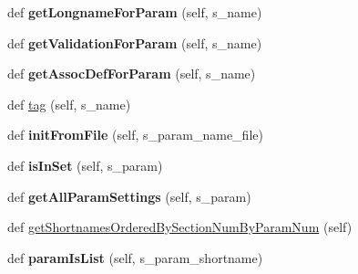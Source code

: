 \begin{DoxyCompactItemize}
\item 
def {\bfseries get\+Longname\+For\+Param} (self, s\+\_\+name)\hypertarget{classnegui_1_1pgparamset_1_1PGParamSet_a4e6b1c2c38ed89404aefcaa95c1ae8e3}{}\label{classnegui_1_1pgparamset_1_1PGParamSet_a4e6b1c2c38ed89404aefcaa95c1ae8e3}

\item 
def {\bfseries get\+Validation\+For\+Param} (self, s\+\_\+name)\hypertarget{classnegui_1_1pgparamset_1_1PGParamSet_a551326a24cfdff0bc6e0d7dd18c70757}{}\label{classnegui_1_1pgparamset_1_1PGParamSet_a551326a24cfdff0bc6e0d7dd18c70757}

\item 
def {\bfseries get\+Assoc\+Def\+For\+Param} (self, s\+\_\+name)\hypertarget{classnegui_1_1pgparamset_1_1PGParamSet_a5a1de9fe821b1f28de85dcf5c2f088eb}{}\label{classnegui_1_1pgparamset_1_1PGParamSet_a5a1de9fe821b1f28de85dcf5c2f088eb}

\item 
def \hyperlink{classnegui_1_1pgparamset_1_1PGParamSet_aef97e7ee992a99258a6bbd7b7bf7c5fe}{tag} (self, s\+\_\+name)
\item 
def {\bfseries init\+From\+File} (self, s\+\_\+param\+\_\+name\+\_\+file)\hypertarget{classnegui_1_1pgparamset_1_1PGParamSet_a0d0286ee3d7b8a845db793ca9a299efc}{}\label{classnegui_1_1pgparamset_1_1PGParamSet_a0d0286ee3d7b8a845db793ca9a299efc}

\item 
def {\bfseries is\+In\+Set} (self, s\+\_\+param)\hypertarget{classnegui_1_1pgparamset_1_1PGParamSet_a1f21b48a029f7b0e92d5c3d149c76f71}{}\label{classnegui_1_1pgparamset_1_1PGParamSet_a1f21b48a029f7b0e92d5c3d149c76f71}

\item 
def {\bfseries get\+All\+Param\+Settings} (self, s\+\_\+param)\hypertarget{classnegui_1_1pgparamset_1_1PGParamSet_a1174515aada4f5fe5f12625caf9d8079}{}\label{classnegui_1_1pgparamset_1_1PGParamSet_a1174515aada4f5fe5f12625caf9d8079}

\item 
def \hyperlink{classnegui_1_1pgparamset_1_1PGParamSet_a4f1aab0d1de87fbf66ea057e3577804c}{get\+Shortnames\+Ordered\+By\+Section\+Num\+By\+Param\+Num} (self)
\item 
def {\bfseries param\+Is\+List} (self, s\+\_\+param\+\_\+shortname)\hypertarget{classnegui_1_1pgparamset_1_1PGParamSet_aced5db45f2ca24451e6a72348158d1d8}{}\label{classnegui_1_1pgparamset_1_1PGParamSet_aced5db45f2ca24451e6a72348158d1d8}


\end{DoxyCompactItemize}
